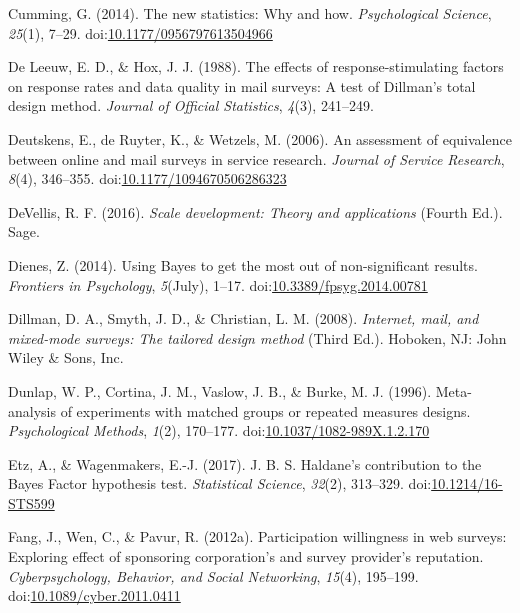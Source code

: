 \documentclass[english,man]{apa6}
\theoremstyle{definition}
\theoremstyle{definition}
\theoremstyle{definition}
\theoremstyle{remark}
\begin{document}
\hypertarget{ref-Cumming2014}{}
Cumming, G. (2014). The new statistics: Why and how. \emph{Psychological
Science}, \emph{25}(1), 7--29.
doi:\href{https://doi.org/10.1177/0956797613504966}{10.1177/0956797613504966}

\hypertarget{ref-DeLeeuw1988}{}
De Leeuw, E. D., \& Hox, J. J. (1988). The effects of
response-stimulating factors on response rates and data quality in mail
surveys: A test of Dillman's total design method. \emph{Journal of
Official Statistics}, \emph{4}(3), 241--249.

\hypertarget{ref-Deutskens2006}{}
Deutskens, E., de Ruyter, K., \& Wetzels, M. (2006). An assessment of
equivalence between online and mail surveys in service research.
\emph{Journal of Service Research}, \emph{8}(4), 346--355.
doi:\href{https://doi.org/10.1177/1094670506286323}{10.1177/1094670506286323}

\hypertarget{ref-DeVellis2016a}{}
DeVellis, R. F. (2016). \emph{Scale development: Theory and
applications} (Fourth Ed.). Sage.

\hypertarget{ref-Dienes2014}{}
Dienes, Z. (2014). Using Bayes to get the most out of non-significant
results. \emph{Frontiers in Psychology}, \emph{5}(July), 1--17.
doi:\href{https://doi.org/10.3389/fpsyg.2014.00781}{10.3389/fpsyg.2014.00781}

\hypertarget{ref-Dillman2008}{}
Dillman, D. A., Smyth, J. D., \& Christian, L. M. (2008).
\emph{Internet, mail, and mixed-mode surveys: The tailored design
method} (Third Ed.). Hoboken, NJ: John Wiley \& Sons, Inc.

\hypertarget{ref-Dunlap1996a}{}
Dunlap, W. P., Cortina, J. M., Vaslow, J. B., \& Burke, M. J. (1996).
Meta-analysis of experiments with matched groups or repeated measures
designs. \emph{Psychological Methods}, \emph{1}(2), 170--177.
doi:\href{https://doi.org/10.1037/1082-989X.1.2.170}{10.1037/1082-989X.1.2.170}

\hypertarget{ref-Etz2015}{}
Etz, A., \& Wagenmakers, E.-J. (2017). J. B. S. Haldane's contribution
to the Bayes Factor hypothesis test. \emph{Statistical Science},
\emph{32}(2), 313--329.
doi:\href{https://doi.org/10.1214/16-STS599}{10.1214/16-STS599}

\hypertarget{ref-Fang2012a}{}
Fang, J., Wen, C., \& Pavur, R. (2012a). Participation willingness in
web surveys: Exploring effect of sponsoring corporation's and survey
provider's reputation. \emph{Cyberpsychology, Behavior, and Social
Networking}, \emph{15}(4), 195--199.
doi:\href{https://doi.org/10.1089/cyber.2011.0411}{10.1089/cyber.2011.0411}
\end{document}
